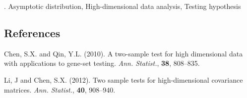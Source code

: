 \documentclass[12pt]{article}
\begin{document}
\vskip 2mm

.
Asymptotic distribution, High-dimensional data analysis, Testing hypothesis 


\subsection*{References}

\begin{description}

\item
Chen, S.X. and Qin, Y.L. (2010). 
A two-sample test for high dimensional data with applications to
gene-set testing. 
\textit{Ann. Statist.},
\textbf{38}, 808--835. 

\item
Li, J and Chen, S.X. (2012). 
Two sample tests for high-dimensional covariance matrices. 
\textit{Ann. Statist.},
\textbf{40}, 908--940. 

\end{description}
\end{document}
